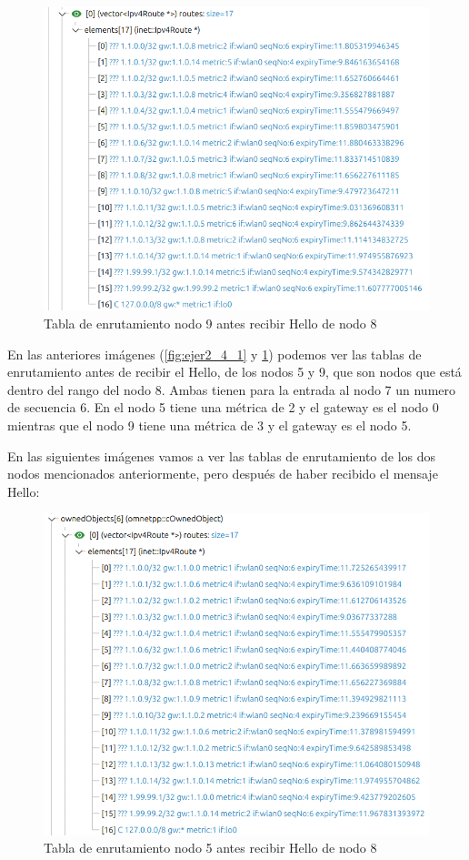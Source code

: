 \begin{figure}[H]
    \centering
    \includegraphics[width=115mm, scale=0.75]{imaxes/dsdv/ejercicio2_4_nodo9.png}
    \caption{Tabla de enrutamiento nodo 9 antes recibir Hello de nodo 8}
    \label{fig:ejer2_4_2}
\end{figure}

En las anteriores imágenes (\ref{fig:ejer2_4_1} y \ref{fig:ejer2_4_2}) podemos ver las tablas de enrutamiento antes de recibir el Hello, de los nodos 5 y 9, que son nodos que está dentro del rango del nodo 8. Ambas tienen para la entrada al nodo 7 un numero de secuencia 6. En el nodo 5 tiene una métrica de 2 y el gateway es el nodo 0 mientras que el nodo 9 tiene una métrica de 3 y el gateway es el nodo 5. 

En las siguientes imágenes vamos a ver las tablas de enrutamiento de los dos nodos mencionados anteriormente, pero después de haber recibido el mensaje Hello:

\begin{figure}[H]
    \centering
    \includegraphics[width=115mm, scale=0.75]{imaxes/dsdv/ejercicio2_4_1_nodo5.png}
    \caption{Tabla de enrutamiento nodo 5 antes recibir Hello de nodo 8}
    \label{fig:ejer2_4_3}
\end{figure}


